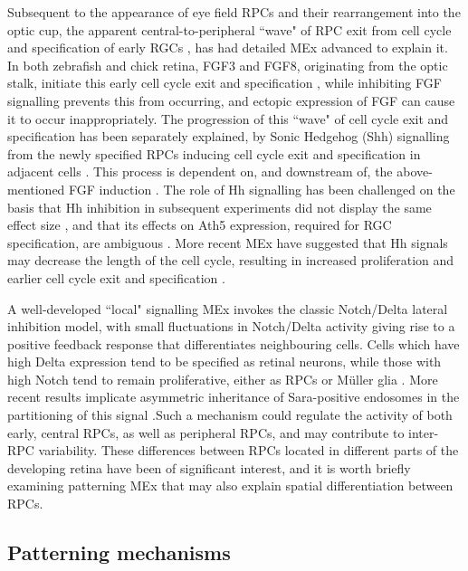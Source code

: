 \documentclass{ut-thesis}
\begin{document}
\begin{NoHyper}
Subsequent to the appearance of eye field RPCs and their rearrangement into the optic cup, the apparent central-to-peripheral ``wave" of RPC exit from cell cycle and specification of early RGCs \cite{Hu1999}, has had detailed MEx advanced to explain it. In both zebrafish and chick retina, FGF3 and FGF8, originating from the optic stalk, initiate this early cell cycle exit and specification \cite{Martinez-Morales2005}, while inhibiting FGF signalling prevents this from occurring, and ectopic expression of FGF can cause it to occur inappropriately. The progression of this ``wave" of cell cycle exit and specification has been separately explained, by Sonic Hedgehog (Shh) signalling from the newly specified RPCs inducing cell cycle exit and specification in adjacent cells \cite{Neumann2000}. This process is dependent on, and downstream of, the above-mentioned FGF induction \cite{Martinez-Morales2005}. The role of Hh signalling has been challenged on the basis that Hh inhibition in subsequent experiments did not display the same effect size \cite{Stenkamp2003}, and that its effects on Ath5 expression, required for RGC specification, are ambiguous \cite{Agathocleous2009}. More recent MEx have suggested that Hh signals may decrease the length of the cell cycle, resulting in increased proliferation and earlier cell cycle exit and specification \cite{Locker2006, Agathocleous2007}.

A well-developed ``local" signalling MEx invokes the classic Notch/Delta lateral inhibition model, with small fluctuations in Notch/Delta activity giving rise to a positive feedback response that differentiates neighbouring cells. Cells which have high Delta expression tend to be specified as retinal neurons, while those with high Notch tend to remain proliferative, either as RPCs or M{\"u}ller glia \cite{Dorsky1995,Dorsky1997}. More recent results implicate asymmetric inheritance of Sara-positive endosomes in the partitioning of this signal \cite{Nerli2020}.Such a mechanism could regulate the activity of both early, central RPCs, as well as peripheral RPCs, and may contribute to inter-RPC variability. These differences between RPCs located in different parts of the developing retina have been of significant interest, and it is worth briefly examining patterning MEx that may also explain spatial differentiation between RPCs.

\subsection{Patterning mechanisms}


\end{NoHyper}
\end{document}
